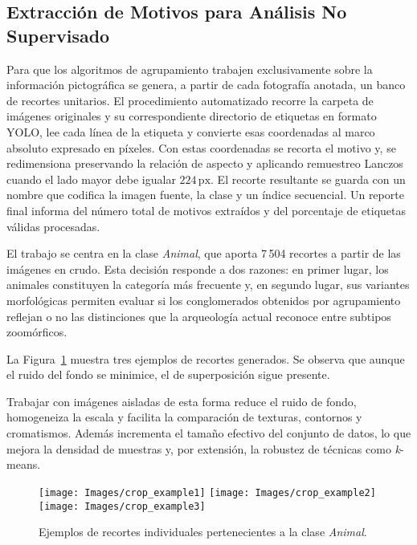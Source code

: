 \subsection{Extracción de Motivos para Análisis No Supervisado}

Para que los algoritmos de agrupamiento trabajen exclusivamente sobre la información pictográfica se genera, a partir de cada fotografía anotada, un banco de recortes unitarios.
El procedimiento automatizado recorre la carpeta de imágenes originales y su correspondiente directorio de etiquetas en formato YOLO, lee cada línea de la etiqueta y convierte esas coordenadas al marco absoluto expresado en píxeles.
Con estas coordenadas se recorta el motivo y, se redimensiona preservando la relación de aspecto y aplicando remuestreo Lanczos cuando el lado mayor debe igualar \(224\,\text{px}\).
El recorte resultante se guarda con un nombre que codifica la imagen fuente, la clase y un índice secuencial.
Un reporte final informa del número total de motivos extraídos y del porcentaje de etiquetas válidas procesadas.

El trabajo se centra en la clase \textit{Animal}, que aporta 7\,504 recortes a partir de las imágenes en crudo.
Esta decisión responde a dos razones: en primer lugar, los animales constituyen la categoría más frecuente y, en segundo lugar, sus variantes morfológicas permiten evaluar si los conglomerados obtenidos por agrupamiento reflejan o no las distinciones que la arqueología actual reconoce entre subtipos zoomórficos.

La Figura~\ref{fig:crop_example} muestra tres ejemplos de recortes generados.
Se observa que aunque el ruido del fondo se minimice, el de superposición sigue presente.

Trabajar con imágenes aisladas de esta forma reduce el ruido de fondo, homogeneiza la escala y facilita la comparación de texturas, contornos y cromatismos.
Además incrementa el tamaño efectivo del conjunto de datos, lo que mejora la densidad de muestras y, por extensión, la robustez de técnicas como \emph{k}-means.

\begin{figure}[!h]
    \centering
    \texttt{[image: Images/crop\_example1]}\hfill
    \texttt{[image: Images/crop\_example2]}\hfill
    \texttt{[image: Images/crop\_example3]}
    \caption{Ejemplos de recortes individuales pertenecientes a la clase \textit{Animal}.}
    \label{fig:crop_example}
\end{figure}

